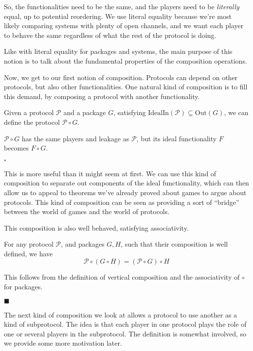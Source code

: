 So, the functionalities need to be the same,
and the players need to be \emph{literally} equal,
up to potential reordering.
We use literal equality because we're most likely
comparing systems with plenty of open channels,
and we want each player to behave the same regardless of what
the rest of the protocol is doing.

Like with literal equality for packages and systems, the main purpose
of this notion is to talk about the fundamental properties
of the composition operations.

Now, we get to our first notion of composition.
Protocols can depend on other protocols, but also other functionalities.
One natural kind of composition is to fill this demand,
by composing a protocol with another functionality.

\begin{definition}
Given a protocol $\mathscr{P}$ and a package $G$, satisfying
$\text{IdealIn}(\mathscr{P}) \subseteq \text{Out}(G)$,
we can define the protocol $\mathscr{P} \circ G$.

$\mathscr{P} \circ G$ has the same players and leakage as $\mathscr{P}$,
but its ideal functionality $F$ becomes $F \circ G$.

$\square$
\end{definition}

This is more useful than it might seem at first.
We can use this kind of composition to separate out components
of the ideal functionality, which can then allow us to appeal
to theorems we've already proved about games to argue
about protocols.
This kind of composition can be seen as providing a
sort of ``bridge'' between the world of games and the world of protocols.

This composition is also well behaved, satisfying associativity.

\begin{claim}
For any protocol $\mathscr{P}$, and packages $G, H$, such that their composition
is well defined, we have
$$
\mathscr{P} \circ (G \circ H) = (\mathscr{P} \circ G) \circ H
$$

 This follows from the definition of vertical composition
and the associativity of $\circ$ for packages.

$\blacksquare$
\end{claim}

The next kind of composition we look at allows a protocol
to use another as a kind of subprotocol.
The idea is that each player in one protocol plays the role
of one or several players in the subprotocol.
The definition is somewhat involved, so we provide some more motivation
later.

